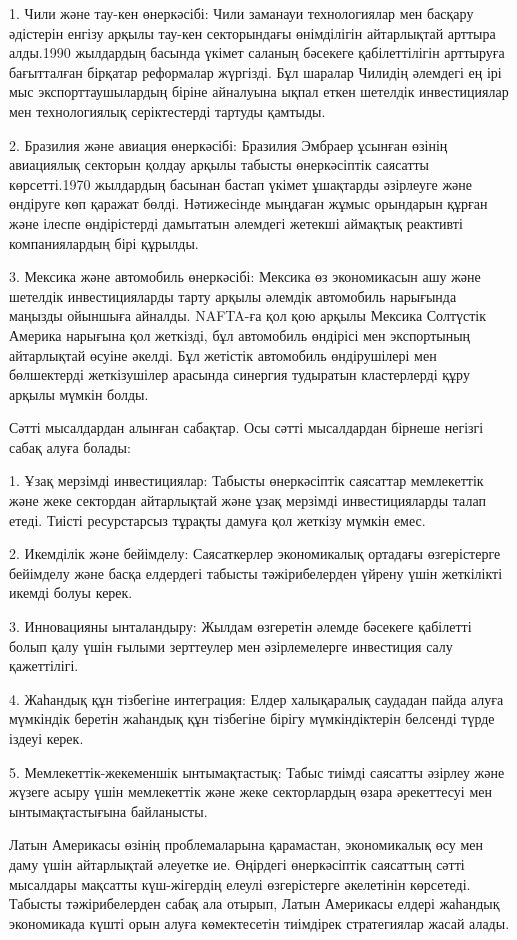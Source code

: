 \begin{multicols}{2}
1. Чили және тау-кен өнеркәсібі: Чили заманауи технологиялар мен басқару
әдістерін енгізу арқылы тау-кен секторындағы өнімділігін айтарлықтай
арттыра алды.1990 жылдардың басында үкімет саланың бәсекеге
қабілеттілігін арттыруға бағытталған бірқатар реформалар жүргізді. Бұл
шаралар Чилидің әлемдегі ең ірі мыс экспорттаушылардың біріне айналуына
ықпал еткен шетелдік инвестициялар мен технологиялық серіктестерді
тартуды қамтыды.

2. Бразилия және авиация өнеркәсібі: Бразилия Эмбраер ұсынған өзінің
авиациялық секторын қолдау арқылы табысты өнеркәсіптік саясатты
көрсетті.1970 жылдардың басынан бастап үкімет ұшақтарды әзірлеуге және
өндіруге көп қаражат бөлді. Нәтижесінде мыңдаған жұмыс орындарын құрған
және ілеспе өндірістерді дамытатын әлемдегі жетекші аймақтық реактивті
компаниялардың бірі құрылды.

3. Мексика және автомобиль өнеркәсібі: Мексика өз экономикасын ашу және
шетелдік инвестицияларды тарту арқылы әлемдік автомобиль нарығында
маңызды ойыншыға айналды. NAFTA-ға қол қою арқылы Мексика Солтүстік
Америка нарығына қол жеткізді, бұл автомобиль өндірісі мен экспортының
айтарлықтай өсуіне әкелді. Бұл жетістік автомобиль өндірушілері мен
бөлшектерді жеткізушілер арасында синергия тудыратын кластерлерді құру
арқылы мүмкін болды.

Сәтті мысалдардан алынған сабақтар. Осы сәтті мысалдардан бірнеше
негізгі сабақ алуға болады:

1. Ұзақ мерзімді инвестициялар: Табысты өнеркәсіптік саясаттар
мемлекеттік және жеке сектордан айтарлықтай және ұзақ мерзімді
инвестицияларды талап етеді. Тиісті ресурстарсыз тұрақты дамуға қол
жеткізу мүмкін емес.

2. Икемділік және бейімделу: Саясаткерлер экономикалық ортадағы
өзгерістерге бейімделу және басқа елдердегі табысты тәжірибелерден
үйрену үшін жеткілікті икемді болуы керек.

3. Инновацияны ынталандыру: Жылдам өзгеретін әлемде бәсекеге қабілетті
болып қалу үшін ғылыми зерттеулер мен әзірлемелерге инвестиция салу
қажеттілігі.

4. Жаһандық құн тізбегіне интеграция: Елдер халықаралық саудадан пайда
алуға мүмкіндік беретін жаһандық құн тізбегіне бірігу мүмкіндіктерін
белсенді түрде іздеуі керек.

5. Мемлекеттік-жекеменшік ынтымақтастық: Табыс тиімді саясатты әзірлеу
және жүзеге асыру үшін мемлекеттік және жеке секторлардың өзара
әрекеттесуі мен ынтымақтастығына байланысты.

Латын Америкасы өзінің проблемаларына қарамастан, экономикалық өсу мен
даму үшін айтарлықтай әлеуетке ие. Өңірдегі өнеркәсіптік саясаттың сәтті
мысалдары мақсатты күш-жігердің елеулі өзгерістерге әкелетінін
көрсетеді. Табысты тәжірибелерден сабақ ала отырып, Латын Америкасы
елдері жаһандық экономикада күшті орын алуға көмектесетін тиімдірек
стратегиялар жасай алады.


\end{multicols}
